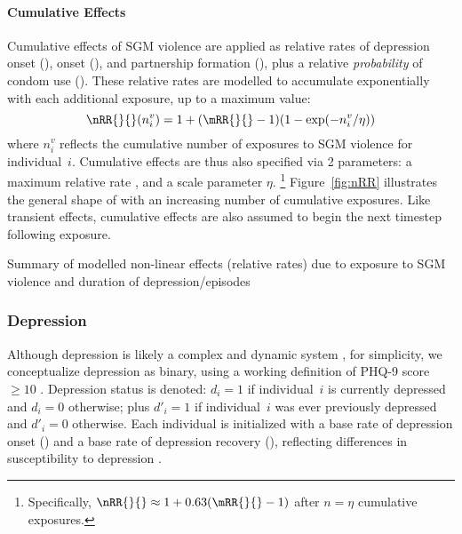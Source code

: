 \paragraph{Cumulative Effects}
Cumulative effects of SGM violence are applied as relative rates of
depression onset (),
\hazdrink onset (), and
partnership formation (), plus
a relative \emph{probability} of condom use ().
These relative rates are modelled to accumulate exponentially
with each additional exposure, up to a maximum value:
\begin{equation}\label{eq:nRR}
  \nRR{}{}(n^v_i) = 1+(\mRR{}{}-1)(1-\exp(-n^v_i/\eta))
\end{equation}
where $n^v_i$ reflects the cumulative number of
exposures to SGM violence for individual~$i$.
Cumulative effects are thus also specified via 2 parameters:
a maximum relative rate \mRR{}{}, and a scale parameter $\eta$.%
\footnote{Specifically, $\nRR{}{} \approx 1 + 0.63 (\mRR{}{}-1)$
  after $n = \eta$ cumulative exposures.}
Figure~\ref{fig:nRR} illustrates the general shape of \nRR{}{}
with an increasing number of cumulative exposures.
Like transient effects, cumulative effects are also assumed
to begin the next timestep following exposure.
\begin{table}
  \caption{Summary of modelled non-linear effects (relative rates) due to
    exposure to SGM violence and
    duration of depression/\hazdrink episodes}
  \label{tab:xrr}
  \centering
\end{table}
\subsubsection{Depression}\label{mod.par.evt.dep}
Although depression is likely a complex and dynamic system \cite{Cramer2016},
for simplicity, we conceptualize depression as binary,
using a working definition of PHQ-9 score $\ge 10$
\cite{Kroenke2001}.
Depression status is denoted:
$d_i = 1$ if individual~$i$ is currently depressed and $d_i = 0$ otherwise; plus
$d'_i = 1$ if individual~$i$ was ever previously depressed and $d'_i = 0$ otherwise.
Each individual is initialized with
a base rate of depression onset () and
a base rate of depression recovery (\Ri{\d}),
reflecting differences in susceptibility to depression \cite{Hankin2015}.
